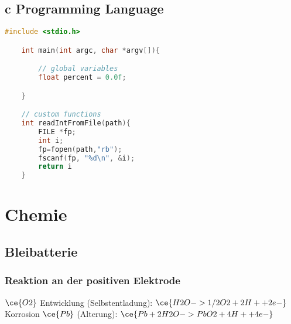 \documentclass[color,german]{latex4ei/latex4ei_sheet}
\begin{document}
\begin{sectionbox}
	\subsection{c Programming Language}
	\begin{lstlisting}[language=C, gobble=4]
	#include <stdio.h>

	int main(int argc, char *argv[]){

		// global variables
		float percent = 0.0f;

	}

	// custom functions
	int readIntFromFile(path){
		FILE *fp;
		int i;
		fp=fopen(path,"rb");
		fscanf(fp, "%d\n", &i);
		return i
	}
	\end{lstlisting}
\end{sectionbox}


\section{Chemie}

\begin{sectionbox}

	\subsection{Bleibatterie}

		\subsubsection{Reaktion an der positiven Elektrode}
		\begin{center}
		\end{center}
		$\ce{O2}$ Entwicklung (Selbstentladung): $\ce{H2O -> 1/2O2 + 2H+ +2e-}$\\
		Korrosion $\ce{Pb}$ (Alterung): $\ce{Pb + 2H2O -> PbO2 + 4H+ +4e-}$
\end{sectionbox}


\end{document}
